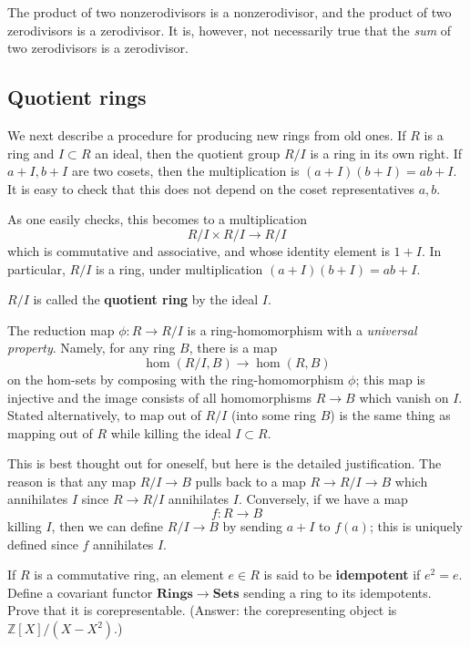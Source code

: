 \begin{exercise} 
The product of two nonzerodivisors is a nonzerodivisor, and the product of two
zerodivisors is a zerodivisor. It is, however, not necessarily true that the
\emph{sum} of two zerodivisors is a zerodivisor.
\end{exercise} 

\subsection{Quotient rings}

We next describe a procedure for producing new rings from old ones. 
If $R$ is a ring and $I \subset R$ an ideal, then the quotient group $R/I$
is a ring in its own right. If $a+I, b+I$ are two cosets, then the
multiplication is $(a+I)(b+I) = ab + I$.  It is easy to check that this does
not depend on the coset representatives $a,b$.

As one easily checks, this becomes to a multiplication 
\[ R/I \times R/I \to R/I  \] 
which is commutative and associative, and 
whose identity element is $1+I$.
In particular, $R/I$ is a ring, under multiplication $(a+I)(b+I) = ab+I$. 
\begin{definition} 
$R/I$ is called the \textbf{quotient ring} by the ideal $I$.
\end{definition} 

The
reduction map $\phi \colon R \to R/I$ is a ring-homomorphism with a
\emph{universal
property}.
Namely, for any ring $B$, there is a map
 \[ \hom(R/I, B) \to \hom(R, B)  \]
 on the hom-sets
 by composing with the ring-homomorphism $\phi$; this map is injective and the
 image consists of all homomorphisms $R \to B$ which vanish on $I$.  
Stated alternatively, to map out of $R/I$ (into some ring $B$) is the same thing as mapping out of
$R$ while killing the ideal $I \subset R$.

This is best thought out for oneself, but here is the detailed justification.
The reason is that any map $R/I \to B$ pulls back to a map $R \to R/I \to B$
which annihilates $I$ since $R \to R/I$ annihilates $I$. Conversely, if we have
a map 
\[ f: R \to B  \]
killing $I$, then we can define $R/I \to B$ by sending $a+I$ to $f(a)$; this is
uniquely defined since $f$ annihilates $I$.

\begin{exercise} 
 If $R$ is a commutative
ring, an element $e \in R$ is said to be \textbf{idempotent} if $e^2 =
e$. Define a covariant functor $\mathbf{Rings} \to \mathbf{Sets}$ sending a
ring to its idempotents. Prove that it is corepresentable. (Answer: the
corepresenting object is $\mathbb{Z}[X]/(X - X^2)$.)
\end{exercise} 

